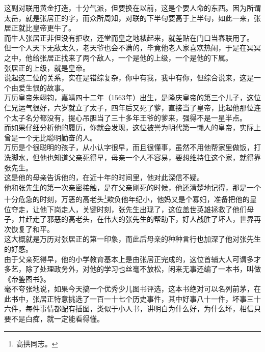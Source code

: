\begin{multicols}{\theparacolNo}
这副对联用黄金打造，十分气派，但要换在以前，这是个要人命的东西。因为所谓太岳，就是张居正的字，而众所周知，对联的下半句要高于上半句，如此一来，张居正就比皇帝更牛了。\\

而牛人张居正非但没有拒收，还堂而皇之地裱起来，就差贴在门口当春联用了。\\

但一个人天下无敌太久，老天爷也会不满的，毕竟他老人家喜欢热闹，于是在冥冥之中，他给张居正找来了两个敌人，一个是他的上级，一个是他的下属。\\

张居正的上级，就是皇帝。\\

说起这二位的关系，实在是错综复杂，你中有我，我中有你，但综合说来，这是一个由爱生恨的故事。\\

万历皇帝朱翊钧，嘉靖四十二年（1563年）出生，是隆庆皇帝的第三个儿子，这位仁兄运气很好，六岁就立了太子，四年后又死了爹，直接当了皇帝，比起他那位连个太子名分都没有，提心吊胆当了三十多年王爷的爹来，强得不是一星半点。\\

而如果仔细分析他的履历，你就会发现，这位被誉为明代第一懒人的皇帝，实际上曾是一个无比聪明勤奋的人。\\

万历是个很聪明的孩子，从小认字很早，而且很懂事，虽然不用他帮家里做饭，打洗脚水，但他也知道父亲死得早，母亲一个人不容易，要想维持住这个家，就得靠张先生。\\

这是他的母亲告诉他的，在近十年的时间里，他对此深信不疑。\\

他和张先生的第一次亲密接触，是在父亲刚死的时候，他还清楚地记得，那是一个十分危急的时刻，万恶的高老头\footnote{高拱同志。}欺负他年纪小，他妈又是个寡妇，准备把他的皇位夺走，让他下岗走人，关键时刻，张先生出现了，这位盖世英雄拯救了他们母子，并赶走了邪恶的高老头，在伟大的张先生的帮助下，好人战胜了坏人，世界再次恢复了和平。\\

这大概就是万历对张居正的第一印象，而此后母亲的种种言行也加深了他对张先生的好感。\\

由于父亲死得早，他的小学教育基本上是由张居正完成的，这位首辅大人可谓多才多艺，除了处理政务外，对他的学习也丝毫不放松，闲来无事还编了一本书，叫做《帝鉴图书》。\\

毫不夸张地说，如果今天搞一个优秀少儿图书评选，这本书绝对可以名列前茅，在此书中，张居正特意挑选了一百一十七个历史事件，其中好事八十一件，坏事三十六件，每件事情都配有插图，类似于小人书，讲明白为什么好，为什么坏，相信只要不是白痴，就一定能看得懂。\\


\end{multicols}
